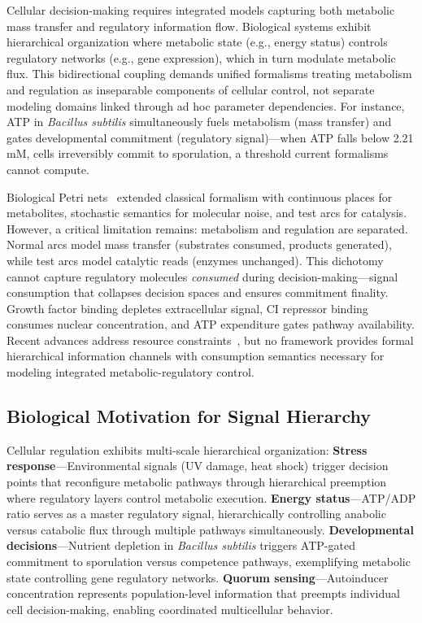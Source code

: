 \documentclass[twocolumn,11pt]{article}
\begin{document}
Cellular decision-making requires integrated models capturing both metabolic mass transfer and regulatory information flow. Biological systems exhibit hierarchical organization where metabolic state (e.g., energy status) controls regulatory networks (e.g., gene expression), which in turn modulate metabolic flux. This bidirectional coupling demands unified formalisms treating metabolism and regulation as inseparable components of cellular control, not separate modeling domains linked through ad hoc parameter dependencies. For instance, ATP in \textit{Bacillus subtilis} simultaneously fuels metabolism (mass transfer) and gates developmental commitment (regulatory signal)---when ATP falls below 2.21 mM, cells irreversibly commit to sporulation, a threshold current formalisms cannot compute.

\noindent Biological Petri nets~\cite{reddy1993,heiner2008} extended classical formalism with continuous places for metabolites, stochastic semantics for molecular noise, and test arcs for catalysis. However, a critical limitation remains: metabolism and regulation are separated. Normal arcs model mass transfer (substrates consumed, products generated), while test arcs model catalytic reads (enzymes unchanged). This dichotomy cannot capture regulatory molecules \textit{consumed} during decision-making---signal consumption that collapses decision spaces and ensures commitment finality. Growth factor binding depletes extracellular signal, CI repressor binding consumes nuclear concentration, and ATP expenditure gates pathway availability. Recent advances address resource constraints~\cite{genovese2021}, but no framework provides formal hierarchical information channels with consumption semantics necessary for modeling integrated metabolic-regulatory control.

\subsection{Biological Motivation for Signal Hierarchy}

Cellular regulation exhibits multi-scale hierarchical organization: \textbf{Stress response}---Environmental signals (UV damage, heat shock) trigger decision points that reconfigure metabolic pathways through hierarchical preemption where regulatory layers control metabolic execution. \textbf{Energy status}---ATP/ADP ratio serves as a master regulatory signal, hierarchically controlling anabolic versus catabolic flux through multiple pathways simultaneously. \textbf{Developmental decisions}---Nutrient depletion in \textit{Bacillus subtilis} triggers ATP-gated commitment to sporulation versus competence pathways, exemplifying metabolic state controlling gene regulatory networks. \textbf{Quorum sensing}---Autoinducer concentration represents population-level information that preempts individual cell decision-making, enabling coordinated multicellular behavior.
\end{document}

